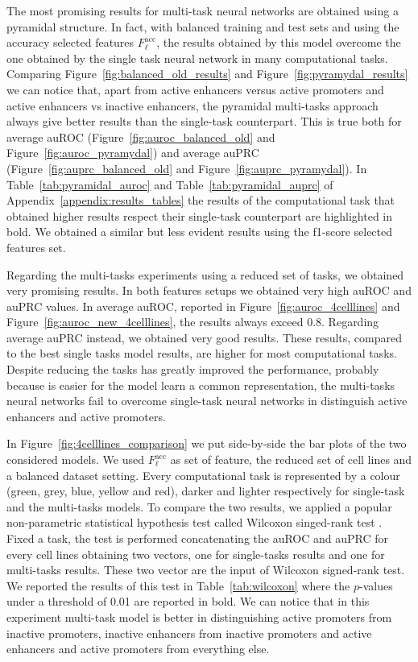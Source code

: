 The most promising results for multi-task neural networks are obtained using a pyramidal structure. In fact, with balanced training and test sets and using the accuracy selected features $F_\ell^{\textrm{acc}}$, the results obtained by this model overcome the one obtained by the single task neural network in many computational tasks. Comparing Figure~\ref{fig:balanced_old_results} and Figure~\ref{fig:pyramydal_results} we can notice that, apart from active enhancers versus active promoters and active enhancers vs inactive enhancers, the pyramidal multi-tasks approach always give better results than the single-task counterpart. This is true both for average auROC (Figure~\ref{fig:auroc_balanced_old} and Figure~\ref{fig:auroc_pyramydal}) and average auPRC (Figure~\ref{fig:auprc_balanced_old} and Figure~\ref{fig:auprc_pyramydal}). In Table~\ref{tab:pyramidal_auroc} and Table~\ref{tab:pyramidal_auprc} of Appendix~\ref{appendix:results_tables} the results of the computational task that obtained higher results respect their single-task counterpart are highlighted in bold. We obtained a similar but less evident results using the f1-score selected features set. 

Regarding the multi-tasks experiments using a reduced set of tasks, we obtained very promising results. In both features setups we obtained very high auROC and auPRC values. In average auROC, reported in Figure~\ref{fig:auroc_4celllines} and Figure~\ref{fig:auroc_new_4celllines}, the results always exceed 0.8. Regarding average auPRC instead, we obtained very good results. These results, compared to the best single tasks model results, are higher for most computational tasks. Despite reducing the tasks has greatly improved the performance, probably because is easier for the model learn a common representation, the multi-tasks neural networks fail to overcome single-task neural networks in distinguish active enhancers and active promoters. 


In Figure~\ref{fig:4celllines_comparison} we put side-by-side the bar plots of the two considered models. We used $F_\ell^{\textrm{acc}}$ as set of feature, the reduced set of cell lines and a balanced dataset setting. Every computational task is represented by a colour (green, grey, blue, yellow and red), darker and lighter respectively for single-task and the multi-tasks models. 
To compare the two results, we applied a popular non-parametric statistical hypothesis test called Wilcoxon singed-rank test \cite{Wilcoxon1945IndividualCB}. Fixed a task, the test is performed concatenating the auROC and auPRC for every cell lines obtaining two vectors, one for single-tasks results and one for multi-tasks results. These two vector are the input of Wilcoxon signed-rank test. We reported the results of this test in Table~\ref{tab:wilcoxon} where the $p$-values under a threshold of 0.01 are reported in bold. We can notice that in this experiment multi-task model is better in distinguishing active promoters from inactive promoters, inactive enhancers from inactive promoters and active enhancers and active promoters from everything else. 

